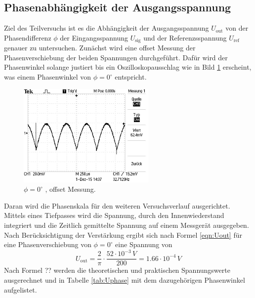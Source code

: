 \subsection{Phasenabhängigkeit der Ausgangsspannung}
Ziel des Teilversuchs ist es die Abhängigkeit der Ausgangsspannung $U_{\text{out}}$ von der Phasendifferenz $\phi$ der Eingangsspannung $U_{\text{sig}}$ und der Referenzsspannung $U_{\text{ref}}$ genauer zu untersuchen. Zunächst wird eine offset Messung der Phasenverschiebung der beiden Spannungen durchgeführt. Dafür wird der Phasenwinkel solange justiert bis ein Oszilloskopausschlag wie in Bild \ref{fig:phi0} erscheint, was einem Phasenwinkel von $\phi = 0^{\circ}$ entspricht.
\begin{figure}
  \centering
  \includegraphics[height=5cm]{picture/1.JPG}
  \caption{$\phi = 0^{\circ}$ , offset Messung.}
  \label{fig:phi0}
\end{figure}
Daran wird die Phasenskala für den weiteren Versuchsverlauf ausgerichtet. Mittels eines Tiefpasses wird die Spannung, durch den Innenwiederstand integriert und die Zeitlich gemittelte Spannung auf einem Messgerät ausgegeben. Nach Berücksichtigung der Verstärkung ergibt sich nach Formel \ref{eqn:Uout} für eine Phasenverschiebung von $\phi = 0^{\circ}$ eine Spannung von
\begin{equation}
  U_{\text{out}} = \frac{2}{\pi} \cdot \frac{52 \cdot 10^{-3} \, V}{200} = 1.66 \cdot 10^{-4} \, V
  \label{eqn:Uout}
\end{equation}
Nach Formel ?? werden die theoretischen und praktischen Spannungswerte ausgerechnet und in Tabelle \ref{tab:Uphase} mit dem dazugehörigen Phasenwinkel aufgelistet.
